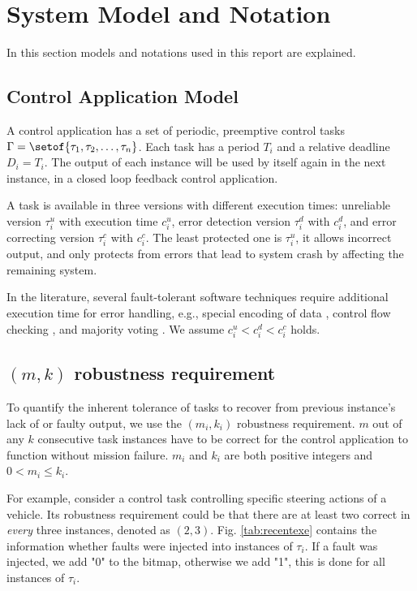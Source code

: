 \chapter{System Model and Notation}

In this section models and notations used in this report are explained.

\section{Control Application Model}
A control application has a set of periodic, preemptive control tasks $\Gamma = \setof{\tau_1, \tau_2, \ldots, \tau_n}$. Each task has a period $T_i$ and a relative deadline $D_i = T_i$.
The output of each instance will be used by itself again in the next instance, in a closed loop feedback control application.

A task is available in three versions with different execution times: unreliable version $\tau_i^u$ with execution time $c_i^u$, error detection version $\tau_i^d$ with $c_i^d$, and error correcting version $\tau_i^c$ with $c_i^c$. The least protected one is $\tau_i^u$, it allows incorrect output, and only protects from errors that lead to system crash by affecting the remaining system.

In the literature, several fault-tolerant software techniques require additional execution time for error handling, e.g., special encoding of data \cite{Schi2009}, control flow checking \cite{10.1109/CGO.2005.34}, and majority voting \cite{1633498}. We assume $c_i^u < c_i^d < c_i^c$ holds.



\section{$(m,k)$ robustness requirement}
To quantify the inherent tolerance of tasks to recover from previous instance's lack of or faulty output, we use the $(m_i,k_i)$ robustness requirement. $m$ out of any $k$ consecutive task instances have to be correct for the control application to  function without mission failure. $m_i$ and $k_i$ are both positive integers and $0 < m_i \le k_i$.

For example, consider a control task controlling specific steering actions of a vehicle. Its robustness requirement could be that there are at least two correct in \textit{every} three instances, denoted as $(2,3)$. Fig. \ref{tab:recentexe} contains the information whether faults were injected into instances of $\tau_i$. If a fault was injected, we add "0" to the bitmap, otherwise we add "1", this is done for all instances of $\tau_i$.

